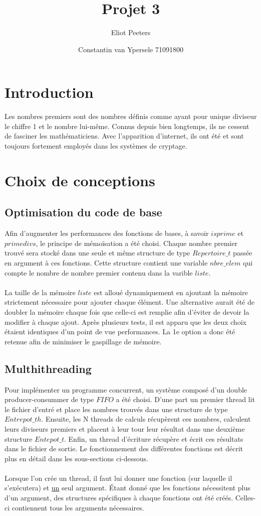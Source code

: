 \documentclass{article}
\title{Projet 3}
\author{Eliot Peeters}
\author{Constantin van Ypersele 71091800}
\begin{document}
\maketitle

\section{Introduction}
Les nombres premiers sont des nombres définis comme ayant pour unique diviseur le chiffre 1 et le nombre lui-même. Connus depuis bien longtemps, ils ne cessent de fasciner les mathématiciens. Avec l'apparition d'internet, ils ont été et sont toujours fortement employés dans les systèmes de cryptage.

\section{Choix de conceptions}

\subsection{Optimisation du code de base}
Afin d'augmenter les performances des fonctions de bases, à savoir $isprime$ et $primedivs$, le principe de mémoïsation a été choisi. Chaque nombre premier trouvé sera stocké dans une seule et même structure de type $Repertoire\_t$ passée en argument à ces fonctions. Cette structure contient une variable $nbre\_elem$ qui compte le nombre de nombre premier contenu dans la varible $liste$. \\ \\
\danger La taille de la mémoire $liste$ est alloué dynamiquement en ajoutant la mémoire strictement nécessaire pour ajouter chaque élément. Une alternative aurait été de doubler la mémoire chaque fois que celle-ci est remplie afin d'éviter de devoir la modifier à chaque ajout. Après plusieurs tests, il est apparu que les deux choix étaient identiques d'un point de vue performances. La 1e option a donc été retenue afin de minimiser le gaspillage de mémoire. 

\subsection{Multhithreading}
Pour implémenter un programme concurrent, un système composé d'un double producer-consummer de type $FIFO$ a été choisi. D'une part un premier thread lit le fichier d'entré et place les nombres trouvés dans une structure de type $Entrepot\_th$. Ensuite, les N threads de calculs récupèrent ces nombres, calculent leurs diviseurs premiers et placent à leur tour leur résultat dans une deuxième structure $Entepot\_t$. Enfin, un thread d'écriture récupère et écrit ces résultats dans le fichier de sortie. Le fonctionnement des différentes fonctions est décrit plus en détail dans les sous-sections ci-dessous.\\ \\
\danger Lorsque l'on crée un thread, il faut lui donner une fonction (sur laquelle il s'exécutera) et \underline{un} seul argument. Étant donné que les fonctions nécessitent plus d'un argument, des structures spécifiques à chaque fonctions ont été créés. Celles-ci contiennent tous les arguments nécessaires.
\end{document}
